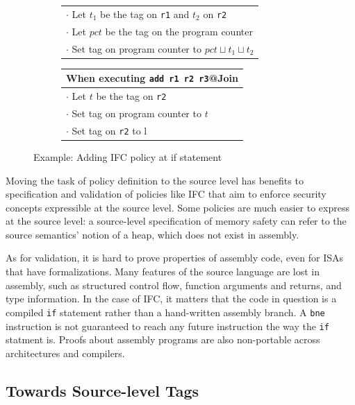 \begin{figure}
\begin{subfigure}{\textwidth}
\begin{tabular}{|l|}
      \(\cdot\) Let \(t_1\) be the tag on {\tt r1} and \(t_2\) on {\tt r2} \\
       \rowcolor{blue!30}
      \(\cdot\) Let \(pct\) be the tag on the program counter \\
      \rowcolor{blue!30}
      \(\cdot\) Set tag on program counter to \(pct \sqcup t_1 \sqcup t_2\) \\
      \hline
    \end{tabular}
    \begin{tabular}{|l|}
      \hline
      When executing {\tt add r1 r2 r3}@{\sc Join} \\
      \hline
      \rowcolor{blue!30}
      \(\cdot\) Let \(t\) be the tag on {\tt r2} \\
      \rowcolor{blue!30}
      \(\cdot\) Set tag on program counter to \(t\) \\
      \rowcolor{red!20}
      \(\cdot\) Set tag on {\tt r2} to {\sc l} \\
      \hline
    \end{tabular}
 \end{subfigure}

  \caption{Example: Adding IFC policy at if statement}
  \label{ch1:ex:if}
\end{figure}

Moving the task of policy definition to the source level has benefits to specification and
validation of policies like IFC that aim to enforce security concepts expressible at the
source level. Some policies are much easier to express at the source level: a source-level
specification of memory safety can refer to the source semantics' notion of a heap, which
does not exist in assembly.

As for validation, it is hard to prove properties of assembly code, even for ISAs that
have formalizations. Many features of the source language are lost in assembly, such as 
structured control flow, function arguments and returns, and type information.
In the case of IFC, it matters that the code in question is a compiled {\tt if} statement
rather than a hand-written assembly branch. A {\tt bne} instruction is not guaranteed to
reach any future instruction the way the {\tt if} statment is.
Proofs about assembly programs are also non-portable across architectures and compilers.

\subsection{Towards Source-level Tags}

